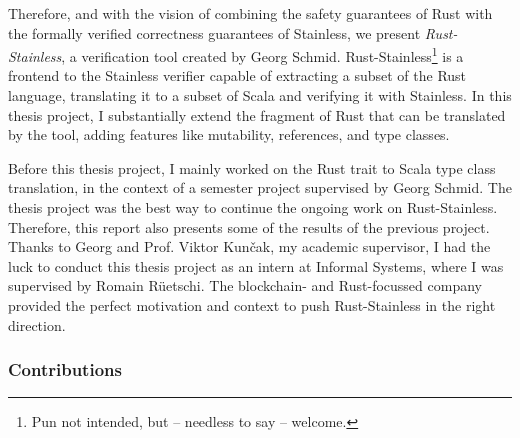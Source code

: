Therefore, and with the vision of combining the safety guarantees of Rust with
the formally verified correctness guarantees of Stainless, we present
\emph{Rust-Stainless}, a verification tool created by Georg Schmid.
Rust-Stainless\footnote{Pun not intended, but -- needless to say -- welcome.} is
a frontend to the Stainless verifier capable of extracting a subset of the Rust
language, translating it to a subset of Scala and verifying it with Stainless.
In this thesis project, I substantially extend the fragment of Rust that can be
translated by the tool, adding features like mutability, references, and type
classes. \newpage

Before this thesis project, I mainly worked on the Rust trait to Scala type
class translation, in the context of a semester project supervised by Georg
Schmid. The thesis project was the best way to continue  the ongoing work on
Rust-Stainless. Therefore, this report also presents some of the results of the
previous project. Thanks to Georg and Prof. Viktor Kun\v{c}ak, my academic
supervisor, I had the luck to conduct this thesis project as an intern at
Informal Systems, where I was supervised by Romain Rüetschi. The blockchain- and
Rust-focussed company provided the perfect motivation and context to push
Rust-Stainless in the right direction.

\subsubsection{Contributions}

